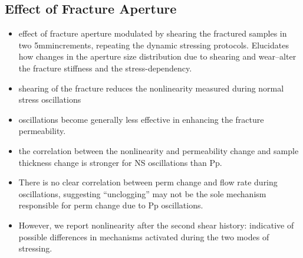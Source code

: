 \documentclass[letterpaper,10pt]{article}
\begin{document}
\newpage

\subsection{Effect of Fracture Aperture}
\begin{itemize}
	\item effect of fracture aperture modulated by shearing the fractured samples in two 5mmincrements, repeating the dynamic stressing protocols. Elucidates how changes in the aperture size distribution due to shearing and wear–alter the fracture stiffness and the stress-dependency.
	\item shearing of the fracture reduces the nonlinearity measured during normal stress oscillations
	\item oscillations become generally less effective in enhancing the fracture permeability.
	\item the correlation between the nonlinearity and permeability change and sample thickness change is stronger for NS oscillations than Pp. 
	\item There is no clear correlation between perm change and flow rate during oscillations, suggesting “unclogging” may not be the sole mechanism responsible for perm change due to Pp oscillations. 
	\item However, we report nonlinearity after the second shear history: indicative of possible differences in mechanisms activated during the two modes of stressing.
\end{itemize}

\end{document}

